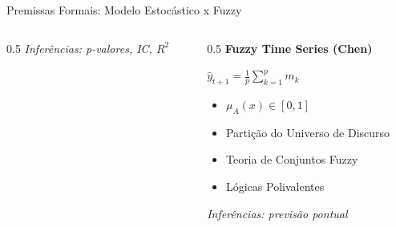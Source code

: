 \documentclass{beamer}
\begin{document}
\begin{frame}{Premissas Formais: Modelo Estocástico x Fuzzy}
\begin{columns}[T]
\begin{column}{0.5\textwidth}
				\vspace{0.3em}                                                                                                                       
				\scriptsize                                                                                                                          
				\textit{Inferências: p-valores, IC, $R^2$}                                                                                           
			\end{column}                                                                                                                             
			
			\begin{column}{0.5\textwidth}                                                                                                            
				\centering                                                                                                                           
				\textbf{Fuzzy Time Series (Chen)}                                                                                                    
				
				\vspace{0.3em}
				\footnotesize
				$\hat{y}_{t+1} = \frac{1}{p}\sum_{k=1}^{p} m_k$
				
				\vspace{0.5em}
				\begin{itemize}
					\item $\mu_A(x) \in [0,1]$
					\item Partição do Universo de Discurso
					\item Teoria de Conjuntos Fuzzy
					\item Lógicas Polivalentes
				\end{itemize}
				
				\vspace{0.3em}
				\scriptsize
				\textit{Inferências: previsão pontual}
			\end{column}
			
		\end{columns}
		
	\end{frame}
\end{document}
